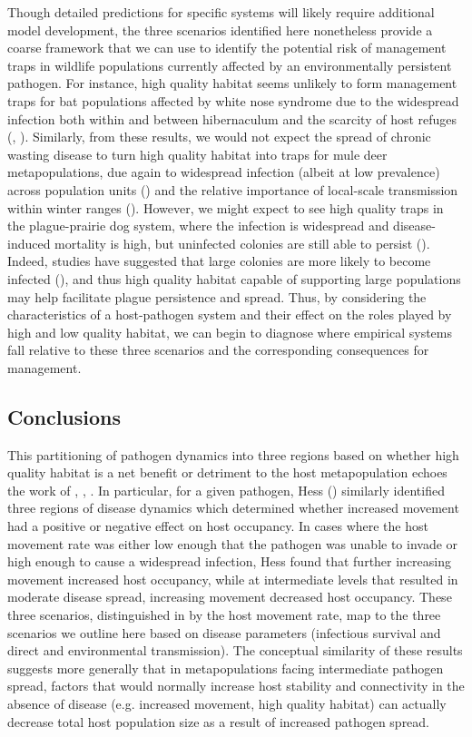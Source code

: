 \documentclass{article}
\begin{document}
Though detailed predictions for specific systems will likely require additional model development, the three scenarios identified here nonetheless provide a coarse framework that we can use to identify the potential risk of management traps in wildlife populations currently affected by an environmentally persistent pathogen.
For instance, high quality habitat seems unlikely to form management traps for bat populations affected by white nose syndrome due to the widespread infection both within and between hibernaculum and the scarcity of host refuges (\cite{Langwig2014}, \cite{ORegan2015}).
Similarly, from these results, we would not expect the spread of chronic wasting disease to turn high quality habitat into traps for mule deer metapopulations, due again to widespread infection (albeit at low prevalence) across population units (\cite{Conner2004}) and the relative importance of local-scale transmission within winter ranges (\cite{Farnsworth2006}).
However, we might expect to see high quality traps in the plague-prairie dog system, where the infection is widespread and disease-induced mortality is high, but uninfected colonies are still able to persist (\cite{Stapp2004}).
Indeed, studies have suggested that large colonies are more likely to become infected (\cite{Snall2008}), and thus high quality habitat capable of supporting large populations may help facilitate plague persistence and spread.
Thus, by considering the characteristics of a host-pathogen system and their effect on the roles played by high and low quality habitat, we can begin to diagnose where empirical systems fall relative to these three scenarios and the corresponding consequences for management.
 
\subsection*{Conclusions}  

This partitioning of pathogen dynamics into three regions based on whether high quality habitat is a net benefit or detriment to the host metapopulation echoes the work of \cite{Hess1996}, \cite{Gog2002}, \cite{Park2012}.
In particular, for a given pathogen, Hess (\cite{Hess1996}) similarly identified three regions of disease dynamics which determined whether increased movement had a positive or negative effect on host occupancy.  
In cases where the host movement rate was either low enough that the pathogen was unable to invade or high enough to cause a widespread infection, Hess found that further increasing movement increased host occupancy, while at intermediate levels that resulted in moderate disease spread, increasing movement decreased host occupancy.
These three scenarios, distinguished in \cite{Hess1996} by the host movement rate, map to the three scenarios we outline here based on disease parameters (infectious survival and direct and environmental transmission).
The conceptual similarity of these results suggests more generally that in metapopulations facing intermediate pathogen spread, factors that would normally increase host stability and connectivity in the absence of disease (e.g. increased movement, high quality habitat) can actually decrease total host population size as a result of increased pathogen spread.
\end{document}
